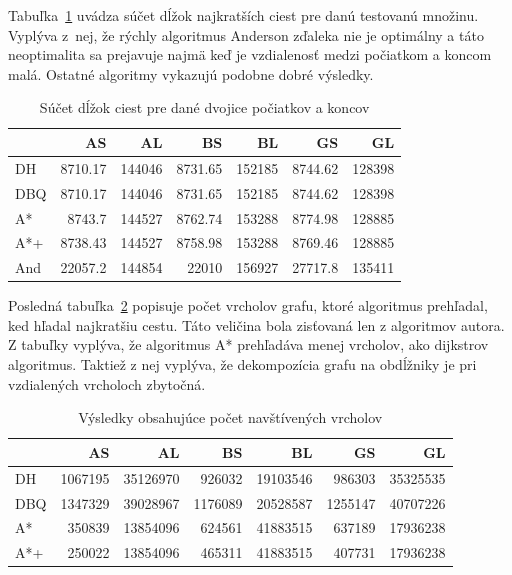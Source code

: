 Tabuľka~\ref{fig:totalpath_result} uvádza súčet dĺžok najkratších ciest pre danú testovanú množinu. Vyplýva z~nej, že rýchly algoritmus Anderson zďaleka nie je optimálny a táto neoptimalita sa prejavuje najmä keď je vzdialenosť medzi počiatkom a koncom malá. Ostatné algoritmy vykazujú podobne dobré výsledky.
\begin{table}[H]
	\centering
	\begin{tabular}{|l | r|r|r|r|r|r|}
	\hline
	 & AS & AL & BS & BL & GS & GL \\
	\hline
	DH & 8710.17 & 144046 & 8731.65& 152185 & 8744.62 & 128398 \\
	DBQ & 8710.17 & 144046 & 8731.65 & 152185 & 8744.62 & 128398 \\
	A* & 8743.7 & 144527& 8762.74 & 153288 & 8774.98 & 128885 \\
	A*+ & 8738.43& 144527 & 8758.98 & 153288 & 8769.46 & 128885 \\
	And & 22057.2 & 144854 & 22010 & 156927 & 27717.8 & 135411 \\
	\hline
	\end{tabular}
	\caption{Súčet dĺžok ciest pre dané dvojice počiatkov a koncov}
	\label{fig:totalpath_result}
\end{table}

Posledná tabuľka~\ref{fig:verticesscanned_result} popisuje
počet vrcholov grafu, ktoré algoritmus prehľadal, ked hľadal najkratšiu cestu. Táto veličina bola zisťovaná len z algoritmov autora. Z tabuľky vyplýva, že algoritmus A* prehľadáva menej vrcholov, ako dijkstrov algoritmus. Taktiež z nej vyplýva, že dekompozícia grafu na obdĺžniky je pri vzdialených vrcholoch zbytočná.
\begin{table}[H]
	\centering
	
	\begin{tabular}{|l | r|r|r|r|r|r|}
		\hline
		  & AS & AL & BS & BL & GS & GL \\
		\hline
		DH & 1067195 & 35126970 & 926032 & 19103546 & 986303 & 35325535 \\
		DBQ & 1347329 & 39028967 & 1176089 & 20528587 & 1255147 & 40707226 \\
		A* & 350839 & 13854096& 624561 & 41883515 & 637189 & 17936238 \\
		A*+ & 250022& 13854096 & 465311 & 41883515 & 407731 & 17936238 \\

		\hline
	\end{tabular}
		
	\caption{Výsledky obsahujúce počet navštívených vrcholov}
	\label{fig:verticesscanned_result}
\end{table}


